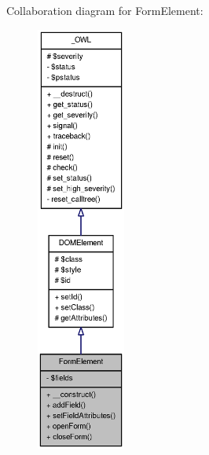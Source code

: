 Collaboration diagram for FormElement:\nopagebreak
\begin{figure}[H]
\begin{center}
\leavevmode
\includegraphics[height=400pt]{classFormElement__coll__graph}
\end{center}
\end{figure}
